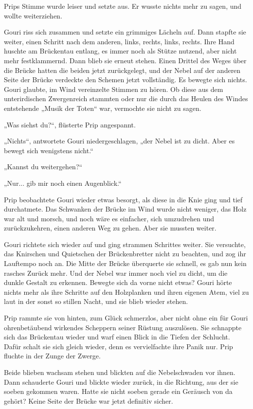 Prips Stimme wurde leiser und setzte aus. Er wusste nichts mehr zu sagen, und wollte weiterziehen.

Gouri riss sich zusammen und setzte ein grimmiges Lächeln auf. Dann stapfte sie weiter, einen Schritt nach dem anderen, links, rechts, links, rechts. Ihre Hand huschte am Brückentau entlang, es immer noch als Stütze nutzend, aber nicht mehr festklammernd. Dann blieb sie erneut stehen. Einen Drittel des Weges über die Brücke hatten die beiden jetzt zurückgelegt, und der Nebel auf der anderen Seite der Brücke verdeckte den Schemen jetzt vollständig. Es bewegte sich nichts. Gouri glaubte, im Wind vereinzelte Stimmen zu hören. Ob diese aus dem unterirdischen Zwergenreich stammten oder nur die durch das Heulen des Windes entstehende „Musik der Toten“ war, vermochte sie nicht zu sagen.

„Was siehst du?“, flüsterte Prip angespannt.

„Nichts“, antwortete Gouri niedergeschlagen, „der Nebel ist zu dicht. Aber es bewegt sich wenigstens nicht.“

„Kannst du weitergehen?“

„Nur... gib mir noch einen Augenblick.“

Prip beobachtete Gouri wieder etwas besorgt, als diese in die Knie ging und tief durchatmete. Das Schwanken der Brücke im Wind wurde nicht weniger, das Holz war alt und morsch, und noch wäre es einfacher, sich umzudrehen und zurückzukehren, einen anderen Weg zu gehen. Aber sie mussten weiter.

Gouri richtete sich wieder auf und ging strammen Schrittes weiter. Sie versuchte, das Knirschen und Quietschen der Brückenbretter nicht zu beachten, und zog ihr Lauftempo noch an. Die Mitte der Brücke überquerte sie schnell, es gab nun kein rasches Zurück mehr. Und der Nebel war immer noch viel zu dicht, um die dunkle Gestalt zu erkennen. Bewegte sich da vorne nicht etwas? Gouri hörte nichts mehr als ihre Schritte auf den Holzplanken und ihren eigenen Atem, viel zu laut in der sonst so stillen Nacht, und sie blieb wieder stehen.

Prip rammte sie von hinten, zum Glück schmerzlos, aber nicht ohne ein für Gouri ohrenbetäubend wirkendes Scheppern seiner Rüstung auszulösen. Sie schnappte sich das Brückentau wieder und warf einen Blick in die Tiefen der Schlucht. Dafür schalt sie sich gleich wieder, denn es vervielfachte ihre Panik nur. Prip fluchte in der Zunge der Zwerge.

Beide blieben wachsam stehen und blickten auf die Nebelschwaden vor ihnen. Dann schauderte Gouri und blickte wieder zurück, in die Richtung, aus der sie soeben gekommen waren. Hatte sie nicht soeben gerade ein Geräusch von da gehört? Keine Seite der Brücke war jetzt definitiv sicher.


